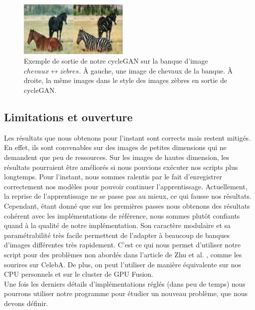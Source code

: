 \begin{figure}[!h]
\centering
\includegraphics[width=150pt]{"images/cycle/cycleRes3"}
\caption{Exemple de sortie de notre cycleGAN sur la banque d'image $chevaux \leftrightarrow z\grave{e}bres$. À gauche, une image de chevaux de la banque. À droite, la même images dans le style des images zèbres en sortie de cycleGAN.}
\label{exemple_zebres}
\end{figure}

\subsection{Limitations et ouverture}

Les résultats que nous obtenons pour l'instant sont corrects mais restent mitigés. En effet, ils sont convenables sur des images de petites dimensions qui ne demandent que peu de ressources. Sur les images de hautes dimension, les résultats pourraient être améliorés si nous pouvions exécuter nos scripts plus longtemps. Pour l'instant, nous sommes ralentis par le fait d'enregistrer correctement nos modèles pour pouvoir continuer l'apprentissage. Actuellement, la reprise de l'apprentissage ne se passe pas au mieux, ce qui fausse nos résultats.\\

Cependant, étant donné que sur les premières passes nous obtenons des résultats cohérent avec les implémentations de référence, nous sommes plutôt confiants quand à la qualité de notre implémentation. Son caractère modulaire et sa paramétrabilité très facile permettent de l'adapter à beaucoup de banques d'images différentes très rapidement. C'est ce qui nous permet d'utiliser notre script pour des problèmes non abordés dans l'article de Zhu et al. \cite{zhu_unpaired_2018}, comme les sourires sur CelebA. De plus, on peut l'utiliser de manière équivalente sur nos CPU personnels et sur le cluster de GPU Fusion.\\

Une fois les derniers détails d'implémentations réglés (dans peu de temps) nous pourrons utiliser notre programme pour étudier un nouveau problème, que nous devons définir.

